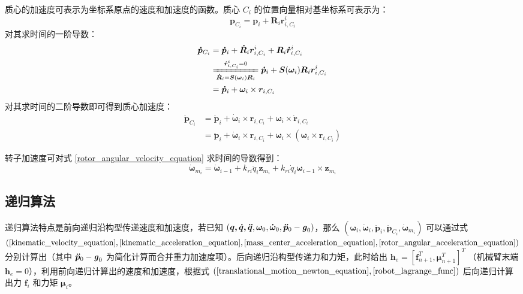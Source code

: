 \documentclass[cn,11pt,chinese,blue,bibstyle=ieeetr]{elegantbook}
\begin{document}
质心的加速度可表示为坐标系原点的速度和加速度的函数。质心 $C_i$ 的位置向量相对基坐标系可表示为：
\begin{equation}
\bm{p}_{C_i} = \bm{p}_i + \bm{R}_i\bm{r}_{i,C_i}^i \nonumber
\end{equation}
对其求时间的一阶导数：
\begin{equation}
\begin{aligned}
\bm{\dot{p}}_{C_i} &= \bm{\dot{p}}_i + \bm{\dot{R}}_i\bm{r}_{i,C_i}^i + \bm{R}_i\bm{\dot{r}}_{i,C_i}^i \\
&\xlongequal[\bm{\dot{R}}_i = \bm{S}(\bm{\omega}_i)\bm{R}_i]{\bm{\dot{r}}_{i,C_i}^i = 0} \bm{\dot{p}}_i + \bm{S}(\bm{\omega}_i)\bm{R}_i\bm{r}_{i,C_i}^i \\
&= \bm{\dot{p}}_i + \bm{\omega}_i\times\bm{r}_{i,C_i}
\end{aligned}
\end{equation}
对其求时间的二阶导数即可得到质心加速度：
\begin{equation}\label{mass_center_acceleration_equation}
\begin{aligned}
\bm{\ddot{p}}_{C_i} &= \bm{\ddot{p}}_i + \bm{\dot{\omega}}_i\times\bm{r}_{i,C_i} + \bm{\omega}_i\times\bm{\dot{r}}_{i,C_i} \\
&= \bm{\ddot{p}}_i + \bm{\dot{\omega}}_i\times\bm{r}_{i,C_i} + \bm{\omega}_i\times\left(\bm{\omega}_i\times\bm{r}_{i,C_i}\right)
\end{aligned}
\end{equation}

转子加速度可对式 \ref{rotor_angular_velocity_equation} 求时间的导数得到：
\begin{equation}\label{rotor_angular_acceleration_equation}
\bm{\dot{\omega}}_{m_i} = \bm{\dot{\omega}}_{i-1} + k_{ri} \ddot{q}_i \bm{z}_{m_i} + k_{ri} \dot{q}_i \bm{\omega}_{i-1} \times \bm{z}_{m_i}
\end{equation}

\subsection{递归算法}

递归算法特点是前向递归沿构型传递速度和加速度，若已知 $(\bm{q,\dot{q},\ddot{q}},\bm{\omega}_0,\bm{\dot{\omega}}_0,\bm{\ddot{p}}_0-\textbf{\textit{g}}_0)$，那么 $(\bm{\omega}_i,\bm{\dot{\omega}}_i,\bm{\ddot{p}}_i,\bm{\ddot{p}}_{C_i},\bm{\dot{\omega}}_{m_i})$ 可以通过式 $(\ref{kinematic_velocity_equation},\ref{kinematic_acceleration_equation},\ref{mass_center_acceleration_equation},\ref{rotor_angular_acceleration_equation})$ 分别计算出（其中 $\bm{\ddot{p}}_0-\textbf{\textit{g}}_0$ 为简化计算而合并重力加速度项）。后向递归沿构型传递力和力矩，此时给出 $\bm{h}_e = \left[\bm{f}_{n+1}^T,\bm{\mu}_{n+1}^T\right]^T$ （机械臂末端 $\bm{h}_e = 0$），利用前向递归计算出的速度和加速度，根据式 $(\ref{translational_motion_newton_equation}, \ref{robot_lagrange_func})$ 后向递归计算出力 $\bm{f}_i$ 和力矩 $\bm{\mu}_i$。
\end{document}
